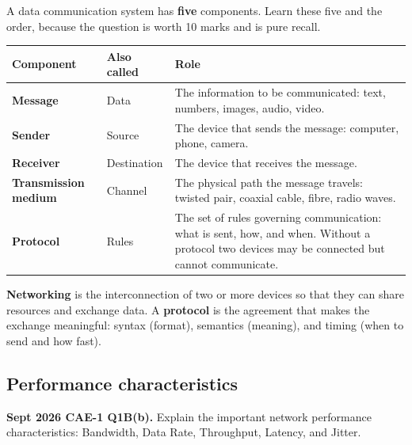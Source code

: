 \documentclass[11pt,a4paper]{article}
\begin{document}
\begin{solbox}
A data communication system has \textbf{five} components. Learn these five and the order, because the question is worth 10 marks and is pure recall.

\begin{center}\small
\begin{tabularx}{\textwidth}{>{\bfseries}p{} p{} X}
\toprule Component & Also called & Role\\
\midrule
Message & Data & The information to be communicated: text, numbers, images, audio, video.\\
Sender & Source & The device that sends the message: computer, phone, camera.\\
Receiver & Destination & The device that receives the message.\\
Transmission medium & Channel & The physical path the message travels: twisted pair, coaxial cable, fibre, radio waves.\\
Protocol & Rules & The set of rules governing communication: what is sent, how, and when. Without a protocol two devices may be connected but cannot communicate.\\
\bottomrule
\end{tabularx}
\end{center}

\textbf{Networking} is the interconnection of two or more devices so that they can share resources and exchange data. A \textbf{protocol} is the agreement that makes the exchange meaningful: syntax (format), semantics (meaning), and timing (when to send and how fast).
\end{solbox}

\subsection{Performance characteristics}

\begin{pyqbox}
\textbf{Sept 2026 CAE-1 Q1B(b).} Explain the important network performance characteristics: Bandwidth, Data Rate, Throughput, Latency, and Jitter.
\end{pyqbox}
\end{document}
